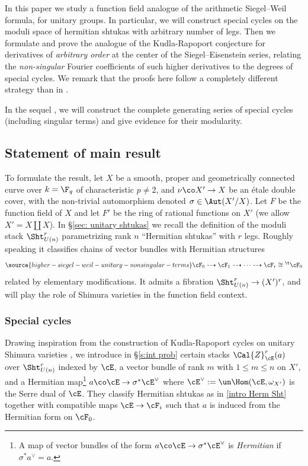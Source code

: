 In this paper we study a function field analogue of the arithmetic Siegel--Weil formula, for unitary groups.
In particular, we will construct special cycles on the moduli space of hermitian shtukas with arbitrary number of legs. Then we formulate and prove the analogue of the Kudla-Rapoport conjecture for derivatives of {\em arbitrary order} at the center of the Siegel--Eisenstein series, relating the {\em non-singular} Fourier coefficients of such higher derivatives to the degrees of special cycles. We remark that the proofs here follow a completely different strategy than in \cite{LZ1}.

In the sequel \cite{FYZ2}, we will construct the complete generating series of special cycles (including singular terms) and give evidence for their modularity.

\subsection{Statement of main result}


To formulate the result, let $X$ be a smooth, proper and geometrically connected curve over $k=\F_q$ of characteristic $p\ne2$, and $\nu \co X' \rightarrow X$ be an \'{e}tale double cover, with the non-trivial automorphism denoted $\sigma \in \Aut(X'/X)$. Let $F$ be the function field of $X$ and let $F'$ be the ring of rational functions on $X'$ (we allow $X'=X\coprod X$). In \S \ref{sec: unitary shtukas} we recall the definition of the moduli stack $\Sht_{U(n)}^r$ parametrizing rank $n$ ``Hermitian shtukas'' with $r$ legs.  Roughly speaking it classifies chains of vector bundles with Hermitian structures
\begin{equation}\label{intro Herm Sht}
\source{higher-siegel-weil-unitary-nonsingular-terms}
\cF_{0}\dashrightarrow\cF_{1}\dashrightarrow\cdots \dashrightarrow \cF_{r}\cong {}^{\t}\cF_{0}
\end{equation}
related by elementary modifications. It admits a fibration $\Sht_{U(n)}^r \rightarrow (X')^r$, and will play the role of Shimura varieties in the function field context.

\subsubsection{Special cycles}
Drawing inspiration from the construction of Kudla-Rapoport cycles on unitary Shimura varieties \cite{KRII}, we introduce in \S \ref{s:int prob} certain stacks $\Cal{Z}_{\cE}^r(a)$ over $\Sht_{U(n)}^{r}$ indexed by $\cE$, a vector bundle of rank $m$ with $1\leq m\leq n$ on $X'$, and a Hermitian map\footnote{A map of vector bundles of the form $a \co \cE \rightarrow \sigma^* \cE^\vee$ is \emph{Hermitian} if $\sigma^* a^\vee = a$.} $a \co \cE \rightarrow \sigma^* \cE^{\vee}$ where $\cE^{\vee}:= \un\Hom(\cE, \omega_{X'})$ is the Serre dual of $\cE$. They classify Hermitian shtukas as in \eqref{intro Herm Sht} together with compatible maps $\cE\to \cF_{i}$ such that $a$ is induced from the Hermitian form on $\cF_{0}$.

